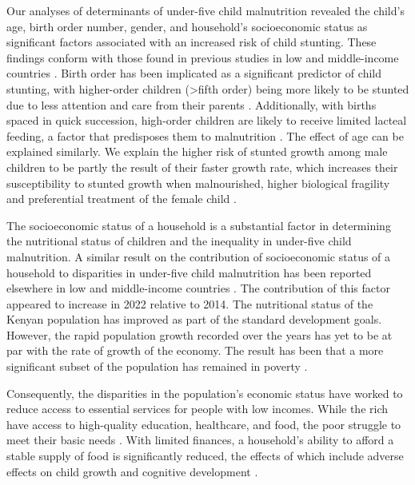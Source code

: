 \documentclass[sn-basic,Numbered,pdflatex]{sn-jnl}
\theoremstyle{remark}
\theoremstyle{definition}
\begin{document}
Our analyses of determinants of under-five child malnutrition revealed
the child's age, birth order number, gender, and household's
socioeconomic status as significant factors associated with an increased
risk of child stunting. These findings conform with those found in
previous studies in low and middle-income countries
\citep{mariara2009, Abuya2012, rabbani2016, jonah2018, kien_trends_2016, Akombi2019}.
Birth order has been implicated as a significant predictor of child
stunting, with higher-order children (\textgreater fifth order) being
more likely to be stunted due to less attention and care from their
parents \citep{rahman2016}. Additionally, with births spaced in quick
succession, high-order children are likely to receive limited lacteal
feeding, a factor that predisposes them to malnutrition
\citep{Gudu2020}. The effect of age can be explained similarly. We
explain the higher risk of stunted growth among male children to be
partly the result of their faster growth rate, which increases their
susceptibility to stunted growth when malnourished, higher biological
fragility \citep{Kraemer2000} and preferential treatment of the female
child \citep{Wamani2007, Farah2019}.

The socioeconomic status of a household is a substantial factor in
determining the nutritional status of children and the inequality in
under-five child malnutrition. A similar result on the contribution of
socioeconomic status of a household to disparities in under-five child
malnutrition has been reported elsewhere in low and middle-income
countries \citep{kien_trends_2016}. The contribution of this factor
appeared to increase in 2022 relative to 2014. The nutritional status of
the Kenyan population has improved as part of the standard development
goals. However, the rapid population growth recorded over the years has
yet to be at par with the rate of growth of the economy. The result has
been that a more significant subset of the population has remained in
poverty \citep{odonnell_analyzing_2008}.

Consequently, the disparities in the population's economic status have
worked to reduce access to essential services for people with low
incomes. While the rich have access to high-quality education,
healthcare, and food, the poor struggle to meet their basic needs
\citep{Masiye2010, Masuku2017, Pathak2011}. With limited finances, a
household's ability to afford a stable supply of food is significantly
reduced, the effects of which include adverse effects on child growth
and cognitive development
\citep{Perignon2014, Bryan2004, Hackett2009, Mutisya2015, Saxena2018}.
\end{document}
